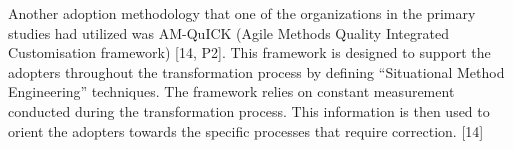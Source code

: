 Another adoption methodology that one of the organizations in the
primary studies had utilized was AM-QuICK (Agile Methods Quality
Integrated Customisation framework) [14, P2]. This framework is designed to
support the adopters throughout the transformation process by defining
``Situational Method Engineering'' techniques. The framework relies on
constant measurement conducted during the transformation process. This
information is then used to orient the adopters towards the specific
processes that require correction. [14]
